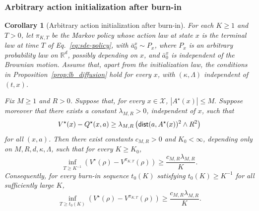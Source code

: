 \documentclass{article}
\newtheorem{cor}[thm]{Corollary}
\newcommand{\1}{\mathbbm{1}}
\newcommand{\dist}{{\sf dist}}
\newcommand{\renyuan}[1]{\textcolor{cyan}{[\textbf{renyuan}:#1]}}
\numberwithin{equation}{section}
\begin{document}
\subsubsection{Arbitrary action initialization after burn-in}
\begin{cor}[Arbitrary action initialization after burn-in]
\label{cor:arb_init}
For each \(K\geq 1\) and \(T>0\), let \(\pi_{K,T}\) be the Markov
policy whose action law at state \(x\) is the terminal law at time \(T\)
of Eq.~\eqref{eq:sde-policy}, with \(\bar a_0^x\sim P_x\), where
\(P_x\) is an arbitrary probability law on \(\mathbb R^d\), possibly
depending on \(x\), and \(\bar a_0^x\) is independent of the Brownian
motion. Assume that, apart from the initialization law, the conditions in
Proposition~\ref{prop:lb_diffusion} hold for every \(x\), with
\((\kappa,\Lambda)\) independent of \((t,x)\).

Fix \(M\geq 1\) and \(R>0\). Suppose that, for every \(x\in\mathcal X\),
$
    |A^\star(x)|\leq M.
$
Suppose moreover that there exists a constant
\(\lambda_{M,R}>0\), independent of \(x\), such that
\[
    V^\star(x)-Q^\star(x,a)
    \geq
    \lambda_{M,R}
    \left(
        \dist(a,A^\star(x))^2\wedge R^2
    \right)
\]
for all \((x,a)\). Then there exist constants
\(c_{M,R}>0\) and \(K_0<\infty\), depending only on %
\(M,R,d,\kappa,\Lambda\), such that for every \(K\geq K_0\),
\[
    \inf_{T\geq K^{-1}}
    \left(
        V^\star(\rho)-V^{\pi_{K,T}}(\rho)
    \right)
    \geq
    \frac{c_{M,R}\lambda_{M,R}}{K}.
\]
Consequently, for every burn-in sequence \(t_0(K)\) satisfying
\(t_0(K)\geq K^{-1}\) for all sufficiently large \(K\),
$$
    \inf_{T\geq t_0(K)}
    \left(
        V^\star(\rho)-V^{\pi_{K,T}}(\rho)
    \right)
    \geq
    \frac{c_{M,R}\lambda_{M,R}}{K}.
$$
\end{cor}
\end{document}
